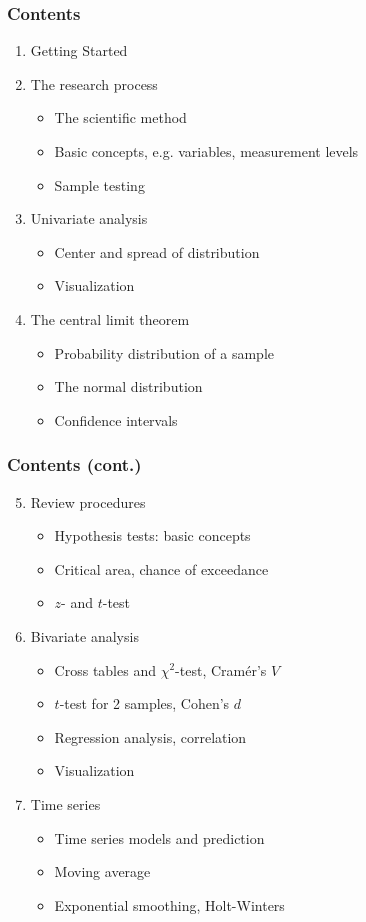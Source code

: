 \documentclass[aspectratio=169]{beamer}
\begin{document}
\begin{frame}
  \frametitle{Contents}
  
  \begin{enumerate}
    \item Getting Started
    \item The research process
    \begin{itemize}
      \item The scientific method
      \item Basic concepts, e.g. variables, measurement levels
      \item Sample testing
    \end{itemize}
    \item Univariate analysis
    \begin{itemize}
      \item Center and spread of distribution
      \item Visualization
    \end{itemize}
    \item The central limit theorem
    \begin{itemize}
      \item Probability distribution of a sample
      \item The normal distribution
      \item Confidence intervals
    \end{itemize}
  \end{enumerate}

\end{frame}

\begin{frame}
\frametitle{Contents (cont.)}

  \begin{enumerate}
    \setcounter{enumi}{4}
    \item Review procedures
    \begin{itemize}
      \item Hypothesis tests: basic concepts
      \item Critical area, chance of exceedance
      \item $z$- and $t$-test
    \end{itemize}
    \item Bivariate analysis
    \begin{itemize}
      \item Cross tables and $\chi^2$-test, Cramér's $V$
      \item $t$-test for 2 samples, Cohen's $d$
      \item Regression analysis, correlation
      \item Visualization
    \end{itemize}
    \item Time series
    \begin{itemize}
      \item Time series models and prediction
      \item Moving average
      \item Exponential smoothing, Holt-Winters
    \end{itemize}
  \end{enumerate}
\end{frame}
\end{document}
